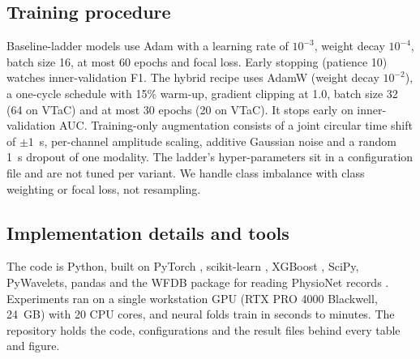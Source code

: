 \documentclass[conference]{IEEEtran}
\begin{document}
\subsection{Training procedure}
Baseline-ladder models use Adam with a learning rate of $10^{-3}$, weight decay $10^{-4}$, batch size 16, at most 60 epochs and focal loss. Early stopping (patience 10) watches inner-validation F1. The hybrid recipe uses AdamW (weight decay $10^{-2}$), a one-cycle schedule with 15\% warm-up, gradient clipping at 1.0, batch size 32 (64 on VTaC) and at most 30 epochs (20 on VTaC). It stops early on inner-validation AUC. Training-only augmentation consists of a joint circular time shift of $\pm1$~s, per-channel amplitude scaling, additive Gaussian noise and a random 1~s dropout of one modality. The ladder's hyper-parameters sit in a configuration file and are not tuned per variant. We handle class imbalance with class weighting or focal loss, not resampling.

\subsection{Implementation details and tools}
The code is Python, built on PyTorch \cite{paszke2019pytorch}, scikit-learn \cite{pedregosa2011sklearn}, XGBoost \cite{chen2016xgboost}, SciPy, PyWavelets, pandas and the WFDB package for reading PhysioNet records \cite{goldberger2000physionet}. Experiments ran on a single workstation GPU (RTX PRO 4000 Blackwell, 24~GB) with 20 CPU cores, and neural folds train in seconds to minutes. The repository holds the code, configurations and the result files behind every table and figure.
\end{document}

